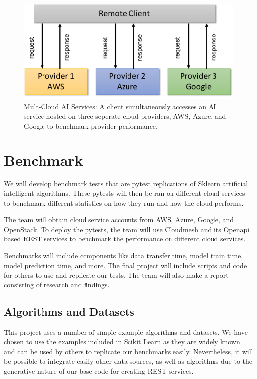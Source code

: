 \begin{figure}
\centering

\includegraphics[width=\columnwidth]{paper/images/architecture-openapi-2.pdf}

\caption{Mult-Cloud AI Services: A client simultaneously accesses an AI service hosted
on three seperate cloud providers, AWS, Azure, and Google to benchmark
provider performance.}
\label{fig:2}
\end{figure}

\section{Benchmark}
\label{sec:benchmark}


We will develop benchmark tests that are pytest replications of Sklearn
artificial intelligent algorithms. These pytests will then be ran on
different cloud services to benchmark different statistics on how they
run and how the cloud performs. 

The team will obtain cloud service
accounts from AWS, Azure, Google, and OpenStack. To deploy the pytests,
the team will use Cloudmesh and its Openapi based REST services to
benchmark the performance on different cloud services. 

Benchmarks will
include components like data transfer time, model train time, model
prediction time, and more. The final project will include scripts and
code for others to use and replicate our tests. The team will also make
a report consisting of research and findings.

\subsection{Algorithms and Datasets}
\label{sec:algorithms-and-datasets}

This project uses a number of simple example algorithms and datasets. We
have chosen to use the examples included in Scikit Learn as they are
widely known and can be used by others to replicate our benchmarks
easily. Nevertheless, it will be possible to integrate easily other data
sources, as well as algorithms due to the generative nature of our base
code for creating REST services.

